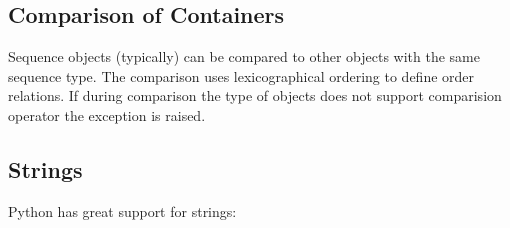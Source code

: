 \documentclass[
]{article}
\begin{document}
\hypertarget{comparison-of-containers}{%
\subsection{\texorpdfstring{Comparison of Containers
}{Comparison of Containers }}\label{comparison-of-containers}}

Sequence objects (typically) can be compared to other objects with the
same sequence type. The comparison uses lexicographical ordering to
define order relations. If during comparison the type of objects does
not support comparision operator the exception is raised.

\hypertarget{strings}{%
\subsection{Strings}\label{strings}}

Python has great support for strings:
\end{document}
